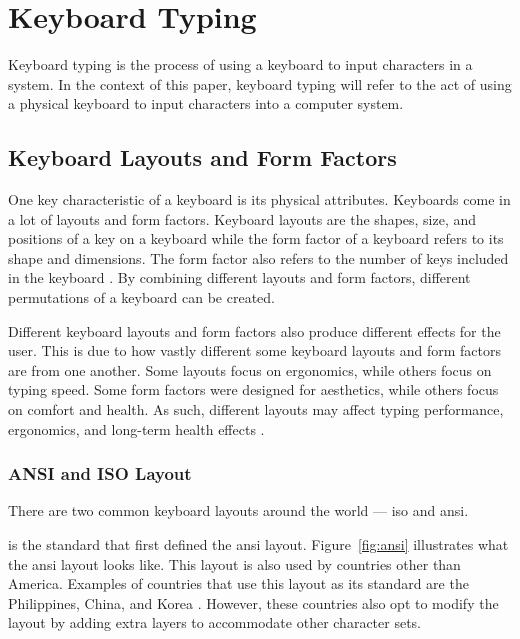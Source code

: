 \documentclass{report}
\begin{document}
\section{Keyboard Typing}

Keyboard typing is the process of using a keyboard to input characters in a
system. In the context of this paper, keyboard typing will refer to the act of
using a physical keyboard to input characters into a computer system.

\subsection{Keyboard Layouts and Form Factors}

One key characteristic of a keyboard is its physical attributes. Keyboards come
in a lot of layouts and form factors. Keyboard layouts are the shapes, size, and
positions of a key on a keyboard while the form factor of a keyboard refers to
its shape and dimensions. The form factor also refers to the number of keys included
in the keyboard \parencite{parkkinen2018}. By combining different layouts and
form factors, different permutations of a keyboard can be created.

Different keyboard layouts and form factors also produce different effects for
the user. This is due to how vastly different some keyboard layouts and form
factors are from one another. Some layouts focus on ergonomics, while others
focus on typing speed. Some form factors were designed for aesthetics, while
others focus on comfort and health. As such, different layouts may affect typing
performance, ergonomics, and long-term health effects \parencite{ciobanu2015}.

\subsubsection{ANSI and ISO Layout}

There are two common keyboard layouts around the world --- \ac{iso} and \ac{ansi}.

\citeauthor{ansi} is the standard that first defined the \ac{ansi} layout.
Figure~\ref{fig:ansi} illustrates what the \ac{ansi} layout looks like. This
layout is also used by countries other than America. Examples of countries that
use this layout as its standard are the Philippines, China, and Korea
\parencite{apple-layout}. However, these countries also opt to modify the layout
by adding extra layers to accommodate other character sets.
\end{document}

